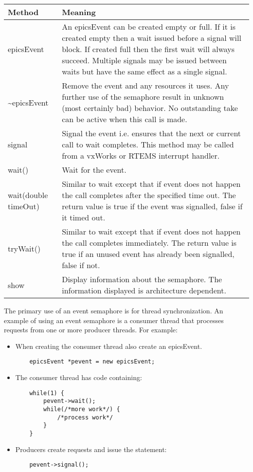 \begin{center}
\begin{longtable}{p{1.25in}p{5.0in}}
\textbf{Method} & \textbf{Meaning}\\
\hline
epicsEvent & An epicsEvent can be created empty or full.
If it is created empty then a wait issued before a signal will block.
If created full then the first wait will always succeed.
Multiple signals may be issued between waits but have the same effect as a single signal.\\
\~{}epicsEvent & Remove the event and any resources it uses.
Any further use of the semaphore result in unknown (most certainly bad) behavior.
No outstanding take can be active when this call is made.\\
signal & Signal the event i.e. ensures that the next or current call to wait completes.
This method may be called from a vxWorks or RTEMS interrupt handler.\\
wait() & Wait for the event.\\
wait(double timeOut) & Similar to wait except that if event does not happen the call completes after the specified time out.
The return value is true if the event was signalled, false if it timed out.\\
tryWait() & Similar to wait except that if event does not happen the call completes immediately.
The return value is true if an unused event has already been signalled, false if not.\\
show & Display information about the semaphore.
The information displayed is architecture dependent.
\end{longtable}

\end{center}


The primary use of an event semaphore is for thread synchronization.
An example of using an event semaphore is a consumer thread that processes requests from one or more producer threads.
For example:

\begin{itemize}
\item When creating the consumer thread also create an epicsEvent.

\begin{verbatim}
    epicsEvent *pevent = new epicsEvent;
\end{verbatim}

\item The consumer thread has code containing:

\begin{verbatim}
    while(1) {
        pevent->wait();
        while(/*more work*/) {
            /*process work*/
        }
    }
\end{verbatim}

\item Producers create requests and issue the statement:

\begin{verbatim}
    pevent->signal();
\end{verbatim}

\end{itemize}

